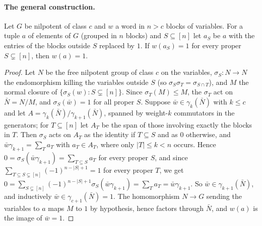 \paragraph{The general construction.}
\begin{lemma}\label{lem:mobius}
Let $G$ be nilpotent of class $c$ and $w$ a word in $n>c$ blocks of variables. For a tuple $a$ of elements of $G$
(grouped in $n$ blocks) and $S\subseteq[n]$ let $a_S$ be $a$ with the entries of the blocks outside $S$ replaced by
$1$. If $w(a_S)=1$ for every proper $S\subsetneq[n]$, then $w(a)=1$.
\end{lemma}
\begin{proof}
Let $N$ be the free nilpotent group of class $c$ on the variables, $\sigma_S:N\to N$ the endomorphism killing the
variables outside $S$ (so $\sigma_S\sigma_T=\sigma_{S\cap T}$), and $M$ the normal closure of
$\{\sigma_S(w):S\subsetneq[n]\}$. Since $\sigma_T(M)\le M$, the $\sigma_T$ act on $\bar N=N/M$, and
$\sigma_S(\bar w)=1$ for all proper $S$. Suppose $\bar w\in\gamma_k(\bar N)$ with $k\le c$ and let
$A=\gamma_k(\bar N)/\gamma_{k+1}(\bar N)$, spanned by weight-$k$ commutators in the generators; for $T\subseteq[n]$
let $A_T$ be the span of those involving exactly the blocks in $T$. Then $\sigma_S$ acts on $A_T$ as the identity if
$T\subseteq S$ and as $0$ otherwise, and $\bar w\gamma_{k+1}=\sum_T a_T$ with $a_T\in A_T$, where only $|T|\le k<n$
occurs. Hence $0=\sigma_S(\bar w\gamma_{k+1})=\sum_{T\subseteq S}a_T$ for every proper $S$, and since
$\sum_{T\subseteq S\subsetneq[n]}(-1)^{n-|S|+1}=1$ for every proper $T$, we get
$0=\sum_{S\subsetneq[n]}(-1)^{n-|S|+1}\sigma_S(\bar w\gamma_{k+1})=\sum_T a_T=\bar w\gamma_{k+1}$. So
$\bar w\in\gamma_{k+1}(\bar N)$, and inductively $\bar w\in\gamma_{c+1}(\bar N)=1$. The homomorphism $N\to G$
sending the variables to $a$ maps $M$ to $1$ by hypothesis, hence factors through $\bar N$, and $w(a)$ is the image
of $\bar w=1$.
\end{proof}


